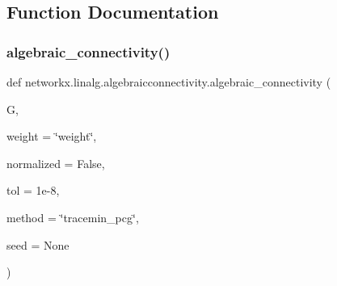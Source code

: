 \subsection{Function Documentation}
\mbox{\label{namespacenetworkx_1_1linalg_1_1algebraicconnectivity_abf07069cd8baafec751f7be25880c595}} 
\subsubsection{\texorpdfstring{algebraic\+\_\+connectivity()}{algebraic\_connectivity()}}
{\footnotesize\ttfamily def networkx.\+linalg.\+algebraicconnectivity.\+algebraic\+\_\+connectivity (\begin{DoxyParamCaption}\item[{}]{G,  }\item[{}]{weight = {\ttfamily \char`\"{}weight\char`\"{}},  }\item[{}]{normalized = {\ttfamily False},  }\item[{}]{tol = {\ttfamily 1e-\/8},  }\item[{}]{method = {\ttfamily \char`\"{}tracemin\+\_\+pcg\char`\"{}},  }\item[{}]{seed = {\ttfamily None} }\end{DoxyParamCaption})}

